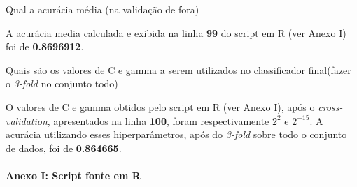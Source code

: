 \documentclass[10pt, a4paper]{exam}
\begin{document}
	\renewcommand{\solutiontitle}{\noindent\textbf{Solução:}\enspace}
	\bracketedpoints
	\setlength\linefillheight{.6cm} %
	
%
%	
\pagestyle{headandfoot}
\chead{}

\lfoot{}
\rfoot{}
	\vspace{0.1in}
	\printanswers
	
	\begin{questions}	    
	    \question
	    Qual a acurácia média (na validação de fora)
	    \begin{solution}
	    	
			A acurácia media calculada e exibida na linha \textbf{99} do script em R (ver Anexo I) foi de \textbf{0.8696912}.
		\end{solution}
	  
	    \question
	    Quais são os valores de C e gamma a serem utilizados no classificador final(fazer o \textit{3-fold} no conjunto todo) 
	     \begin{solution}
	    	
	  		O valores de C e gamma obtidos pelo script em R (ver Anexo I), após o \textit{cross-validation}, apresentados na linha \textbf{100}, foram respectivamente \textbf{$2^2$} e \textbf{$2^{-15}$}. A acurácia utilizando esses hiperparâmetros, após do \textit{3-fold }sobre todo o conjunto de dados, foi de \textbf{0.864665}.
	      \end{solution}
		\paragraph{Anexo I: Script fonte em R}
		\paragraph{}
		

		\end{questions}
		
\end{document}
